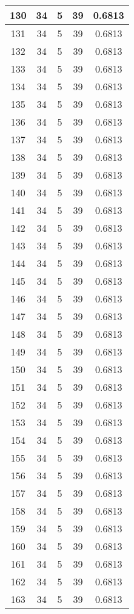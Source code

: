 \documentclass[letterpaper, 12pt]{article}
\begin{document}
\begin{longtable}{|c|c|c|c|c|}
\hline
130 & 34 & 5 & 39 & 0.6813 \\
\hline
131 & 34 & 5 & 39 & 0.6813 \\
\hline
132 & 34 & 5 & 39 & 0.6813 \\
\hline
133 & 34 & 5 & 39 & 0.6813 \\
\hline
134 & 34 & 5 & 39 & 0.6813 \\
\hline
135 & 34 & 5 & 39 & 0.6813 \\
\hline
136 & 34 & 5 & 39 & 0.6813 \\
\hline
137 & 34 & 5 & 39 & 0.6813 \\
\hline
138 & 34 & 5 & 39 & 0.6813 \\
\hline
139 & 34 & 5 & 39 & 0.6813 \\
\hline
140 & 34 & 5 & 39 & 0.6813 \\
\hline
141 & 34 & 5 & 39 & 0.6813 \\
\hline
142 & 34 & 5 & 39 & 0.6813 \\
\hline
143 & 34 & 5 & 39 & 0.6813 \\
\hline
144 & 34 & 5 & 39 & 0.6813 \\
\hline
145 & 34 & 5 & 39 & 0.6813 \\
\hline
146 & 34 & 5 & 39 & 0.6813 \\
\hline
147 & 34 & 5 & 39 & 0.6813 \\
\hline
148 & 34 & 5 & 39 & 0.6813 \\
\hline
149 & 34 & 5 & 39 & 0.6813 \\
\hline
150 & 34 & 5 & 39 & 0.6813 \\
\hline
151 & 34 & 5 & 39 & 0.6813 \\
\hline
152 & 34 & 5 & 39 & 0.6813 \\
\hline
153 & 34 & 5 & 39 & 0.6813 \\
\hline
154 & 34 & 5 & 39 & 0.6813 \\
\hline
155 & 34 & 5 & 39 & 0.6813 \\
\hline
156 & 34 & 5 & 39 & 0.6813 \\
\hline
157 & 34 & 5 & 39 & 0.6813 \\
\hline
158 & 34 & 5 & 39 & 0.6813 \\
\hline
159 & 34 & 5 & 39 & 0.6813 \\
\hline
160 & 34 & 5 & 39 & 0.6813 \\
\hline
161 & 34 & 5 & 39 & 0.6813 \\
\hline
162 & 34 & 5 & 39 & 0.6813 \\
\hline
163 & 34 & 5 & 39 & 0.6813 \\

\end{longtable}
\end{document}
